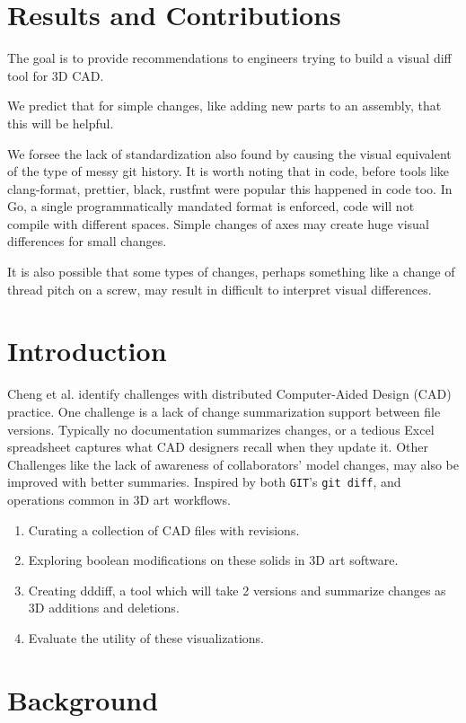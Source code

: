 \documentclass[sigconf,]{acmart}
\begin{document}
\section{Results and Contributions}
The goal is to provide recommendations to engineers trying to build a visual diff tool for 3D CAD.

We predict that for simple changes, like adding new parts to an assembly, that this will be helpful.

We forsee the lack of standardization also found by \citet{cheng2023age} causing the visual equivalent of the type of messy git history.
It is worth noting that in code, before tools like clang-format, prettier, black, rustfmt were popular this happened in code too.
In Go, a single programmatically mandated format is enforced, code will not compile with different spaces.
Simple changes of axes may create huge visual differences for small changes.

It is also possible that some types of changes, perhaps something like a change of thread pitch on a screw, may result in difficult to interpret visual differences.
\section{Introduction}

Cheng et al.\cite{cheng2023age} identify challenges with distributed Computer-Aided Design (CAD) practice.
One challenge is a lack of change summarization support between file versions.
Typically no documentation summarizes changes, or a tedious Excel spreadsheet captures what CAD designers recall when they update it.
Other Challenges like the lack of awareness of collaborators' model changes, may also be improved with better summaries.
Inspired by both \texttt{GIT}'s \texttt{git diff}, and operations common in 3D art workflows.

\begin{enumerate}
	\item Curating a collection of CAD files with revisions.
	\item Exploring boolean modifications on these solids in 3D art software.
	\item Creating dddiff, a tool which will take 2 versions and summarize changes as 3D additions and deletions.
	\item Evaluate the utility of these visualizations.
\end{enumerate}


\section{Background}
\end{document}
